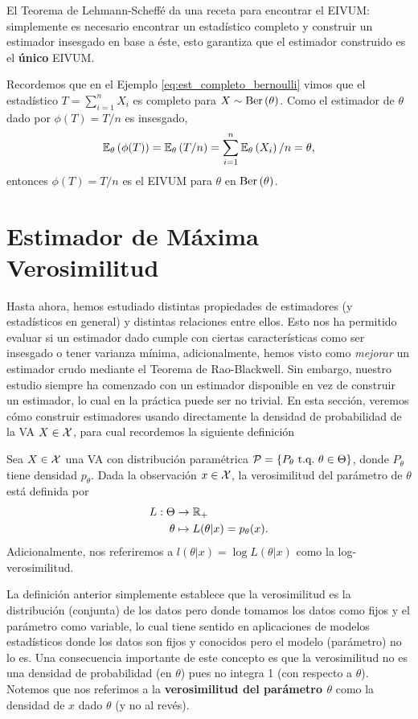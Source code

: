 El Teorema de Lehmann-Scheffé da una receta para encontrar el EIVUM: simplemente es necesario encontrar un estadístico completo y construir un estimador insesgado en base a éste, esto garantiza que el estimador construido es el \textbf{único} EIVUM.
\begin{example}
	Recordemos que en el Ejemplo \ref{eq:est_completo_bernoulli} vimos que el estadístico $T=\sum_{i=1}^nX_i$ es completo para $X\sim\text{Ber}\left(\theta\right)$. Como el estimador de $\theta$ dado por $\phi(T) = T/n$ es insesgado, 
\begin{equation}
	\mathbb{E}_\theta \left(\phi(T)\right) = \mathbb{E}_\theta \left(T/n\right) = \sum_{i=1}^n \mathbb{E}_\theta \left(X_i\right) /n = \theta,
\end{equation}
entonces $\phi(T) = T/n$ es el EIVUM para $\theta$ en $\text{Ber}\left(\theta\right)$.	
\end{example}


\section{Estimador de Máxima Verosimilitud} %
\label{sec:estimador_de_máxima_verosimilitud}
Hasta ahora, hemos estudiado distintas propiedades de estimadores (y estadísticos en general) y distintas relaciones entre ellos. Esto nos ha permitido evaluar si un estimador dado cumple con ciertas características como ser insesgado o tener varianza mínima, adicionalmente, hemos visto como \textit{mejorar} un estimador crudo mediante el Teorema de Rao-Blackwell. Sin embargo, nuestro estudio siempre ha comenzado con un estimador disponible en vez de construir un estimador, lo cual en la práctica puede ser no trivial. En esta sección, veremos cómo construir estimadores usando directamente la densidad de probabilidad de la VA $X\in{\mathcal X}$, para cual recordemos la siguiente definición

\begin{definition}
	\label{def:verosimilitud}
	Sea $X\in{\mathcal X}$ una VA con distribución paramétrica $\mathcal{P} = \{P_\theta\ {\text{t.q.}}\ \theta\in\Theta\}$, donde $P_\theta$ tiene densidad $p_\theta$. Dada la observación $x \in{\mathcal X}$, la verosimilitud del parámetro de $\theta$ está definida por
	\begin{align*}
		L: \Theta &\rightarrow {\mathbb R}_+\\
			\theta &\mapsto L(\theta|x) = p_\theta(x).
	\end{align*}
	Adicionalmente, nos referiremos a $l(\theta|x)=\log L(\theta|x)$ como la log-verosimilitud.
\end{definition}
La definición anterior simplemente establece que la verosimilitud es la distribución (conjunta) de los datos pero donde tomamos los datos como fijos y el parámetro como variable, lo cual tiene sentido en aplicaciones de modelos estadísticos donde los datos son fijos y conocidos pero el modelo (parámetro)
no lo es. Una consecuencia importante de este concepto es que la verosimilitud no es una densidad de probabilidad (en $\theta$) pues no integra 1 (con respecto a $\theta$). Notemos que nos referimos a la \textbf{verosimilitud del parámetro $\theta$} como la densidad de $x$ dado $\theta$ (y no al revés).

